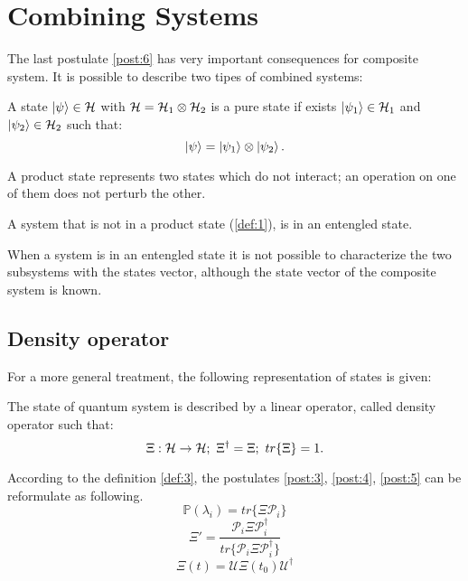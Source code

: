 \section{Combining Systems}
The last postulate \ref{post:6} has very important consequences for composite system. It is possible
to describe two tipes of combined systems:

    \begin{definition}
        A state $\ket{\psi}\in\mathcal{H}$ with $\mathcal{H}=\mathcal{H}_1\otimes\mathcal{H}_2$ is a
        pure state if exists $\ket{\psi_1}\in\mathcal{H}_1$ and $\ket{\psi_2}\in\mathcal{H}_2$
        such that:
        \begin{equation*}
            \ket{\psi}=\ket{\psi_1}\otimes\ket{\psi_2}.
        \end{equation*}
        \label{def:1}
    \end{definition}
    A product state represents two states which do not interact; an operation on one of 
    them does not perturb the other.

    \begin{definition}
        A system that is not in a product state (\ref{def:1}), is in an entengled state. 
        \label{def:2}
    \end{definition}
    When a system is in an entengled state it is not possible to characterize the two subsystems
    with the states vector, although the state vector of the composite system is known.

    \subsection{Density operator}
        For a more general treatment, the following representation of states is given:
        \begin{definition}
            The state of quantum system is described by a linear operator, called density
            operator such that:
            \begin{equation*}
                \Xi:\Hilbert\to\Hilbert;\ \Xi^\dagger=\Xi;\ tr\{\Xi\}=1.
            \end{equation*}
            \label{def:3}
        \end{definition}
        According to the definition \ref{def:3}, the postulates \ref{post:3}, \ref{post:4},
        \ref{post:5} can be reformulate as following.
        \begin{equation}
            \mathbb{P}(\lambda_i)=tr\{\Xi\mathcal{P}_i\}
            \label{post:3.1}
        \end{equation}
        \begin{equation}
            \Xi'=\frac{\mathcal{P}_i\Xi\mathcal{P}_i^\dagger}
            {tr\{\mathcal{P}_i\Xi\mathcal{P}_i^\dagger\}}
            \label{post:4.1}
        \end{equation}
        \begin{equation}
            \Xi(t)=\mathcal{U}\Xi(t_0)\mathcal{U}^\dagger
            \label{post:5.1}
        \end{equation}